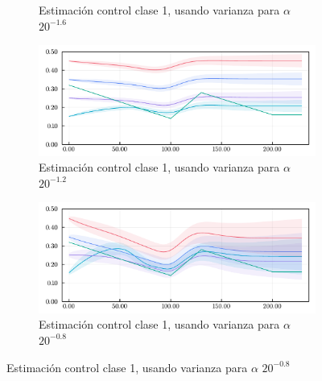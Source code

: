 \begin{figure}[H]
\begin{subfigure}[b]{0.47\textwidth}
     \caption{Estimación control clase 1, usando varianza para \(\alpha\) \(20^{-1.6}\)}
     \label{fig:legend-sensi-acov-class1--b}
\end{subfigure} 
\hfill
\begin{subfigure}[b]{0.47\textwidth}
     \centering
     \includegraphics[width=\textwidth]{img/resultados/synth/sensialphacov_alphacov0-027_0alphaini0-15_0-1_0-45_high1_b2real1-88_gereal0-1961_gireal0-1389_acov0-8_aini0-27675_gcov0-05gamma_e_0-1961_gamma_i_0-1389_beta_2_1-8800.pdf}
     \caption{Estimación control clase 1, usando varianza para \(\alpha\) \(20^{-1.2}\)}
     \label{fig:legend-sensi-acov-class1--c}
\end{subfigure} 
\hfill
\begin{subfigure}[b]{0.47\textwidth}
     \centering
     \includegraphics[width=\textwidth]{img/resultados/synth/sensialphacov_alphacov0-091_0alphaini0-15_0-1_0-45_high1_b2real1-88_gereal0-1961_gireal0-1389_acov0-8_aini0-27675_gcov0-05gamma_e_0-1961_gamma_i_0-1389_beta_2_1-8800.pdf}
     \caption{Estimación control clase 1, usando varianza para \(\alpha\) \(20^{-0.8}\)}
     \label{fig:legend-sensi-acov-class1--d}

\end{subfigure}
\end{figure}
